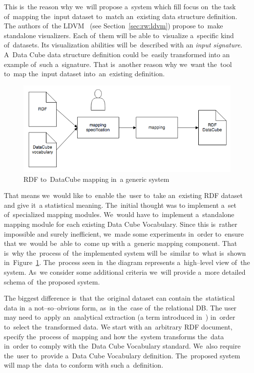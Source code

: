 This is~the reason why we~will propose a~system which fill focus on~the task of~mapping the~input dataset to~match an~existing data structure definition. 
The authors of~the LDVM~\cite{ldvm} (see Section~\ref{sec:rw:ldvm}) propose to~make standalone
visualizers. Each of~them will 
be able to~visualize a~specific kind of~datasets. Its visualization abilities will be~described with
an \emph{input signature}. A~Data Cube data structure definition could be~easily transformed into
an example of~such a~signature. That is~another reason why we~want the~tool to~map the~input dataset into~an~existing definition.

\begin{figure}
	\centering
	\includegraphics[width=140mm]{img/generic-mapping.png}
	\caption{RDF to~DataCube mapping in~a generic system}
	\label{fig:generic-mapping}
\end{figure}

That means we~would like to~enable the~user to~take an~existing RDF
dataset and give it~a statistical meaning. The~initial thought was to
implement a~set of~specialized 
mapping modules. We~would have to~implement a~standalone mapping module for
each existing Data Cube Vocabulary. Since this is~rather impossible and 
surely inefficient, we~made some experiments in~order to~ensure that we~would be~able to~come 
up with a~generic mapping component. That is~why the~process of~the implemented
system will be~similar to~what is~shown in~Figure~\ref{fig:generic-mapping}. The~process seen in~the diagram represents a~high--level view of~the system. As~we 
consider some additional criteria we~will provide a~more detailed schema of~the 
proposed system. 

The biggest difference is~that the~original dataset can contain the~statistical 
data in~a not--so--obvious form, as~in the~case of~the relational DB.
The user may need to~apply an~analytical 
extraction (a term introduced in~\cite{ldvm}) in~order to~select the~transformed data.
We start with an~arbitrary RDF document, 
specify the~process of~mapping and how the~system transforms the~data in~order
to comply with the~Data Cube Vocabulary standard. We~also require the~user to~provide a~Data Cube Vocabulary definition. The~proposed system will map the~data
to conform with such a~definition.


